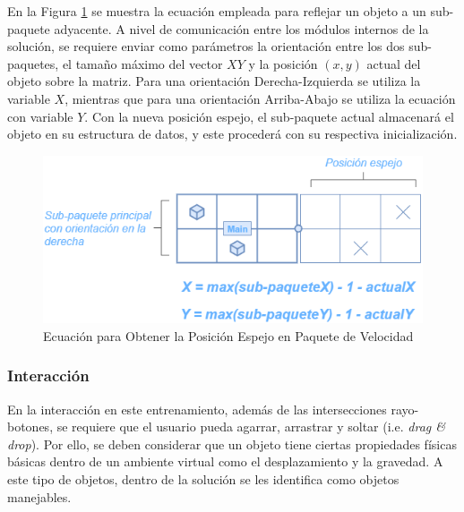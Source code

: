 \documentclass[conference]{IEEEtran}
\begin{document}
En la Figura \ref{fig:ecespejo} se muestra la ecuación empleada para reflejar un objeto a un sub-paquete adyacente. A nivel de comunicación entre los módulos internos de la solución, se requiere enviar como parámetros la orientación entre los dos sub-paquetes, el tamaño máximo del vector $XY$ y la posición $(x,y)$ actual del objeto sobre la matriz. Para una orientación Derecha-Izquierda se utiliza la variable $X$, mientras que para una orientación Arriba-Abajo se utiliza la ecuación con variable $Y$. Con la nueva posición espejo, el sub-paquete actual almacenará el objeto en su estructura de datos, y este procederá con su respectiva inicialización.


\begin{figure}[htpb!]
 \centering 
\includegraphics[width=1.0\columnwidth]{images/ecespejo.png}
\caption{Ecuación para Obtener la Posición Espejo en Paquete de Velocidad}
\label{fig:ecespejo}
\end{figure}

\subsubsection*{Interacci\'on}

En la interacción en este entrenamiento, además de las intersecciones rayo-botones, se requiere que el usuario pueda agarrar, arrastrar y soltar (i.e. \textit{drag \& drop}). Por ello, %
se deben considerar que un objeto tiene ciertas propiedades físicas básicas dentro de un ambiente virtual como el desplazamiento y la gravedad. A este tipo de objetos, dentro de la solución se les identifica como objetos manejables.

\end{document}
